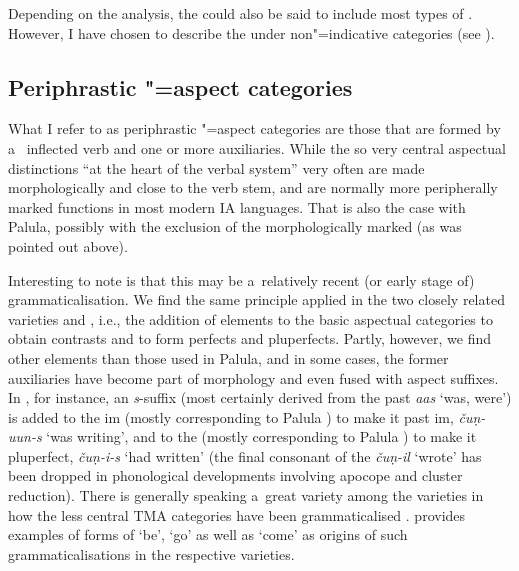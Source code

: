 Depending on the analysis, the  could also be said to include most types of . However, I have chosen to describe the  under non"=indicative categories (see ).


\subsection{Periphrastic "=aspect categories}
\label{subsec:9-1-5}

What I refer to as periphrastic "=aspect categories are those that are formed by a~ inflected verb and one or more auxiliaries. While the so very central aspectual distinctions ``at the heart of the  verbal system'' \citep[262]{masica1991} very often are made morphologically and close to the verb stem,  and  are normally more peripherally marked functions in most modern IA languages. That is also the case with Palula, possibly with the exclusion of the morphologically marked  (as was pointed out above). 



Interesting to note is that this may be a~relatively recent (or early stage of) grammaticalisation. We find the same principle applied in the two closely related varieties  and , i.e., the addition of elements to the basic aspectual categories to obtain  contrasts and to form perfects and pluperfects. Partly, however, we find other elements than those used in Palula, and in some cases, the former auxiliaries have become part of  morphology and even fused with aspect suffixes. In , for instance, an \textit{s}-suffix (most certainly derived from the past  \textit{aas} `was, were') is added to the im (mostly corresponding to Palula ) to make it past im, \textit{čuṇ-uun-s} `was writing', and to the  (mostly corresponding to Palula ) to make it pluperfect, \textit{čuṇ-i-s} `had written' (the final consonant of the  \textit{čuṇ-il} `wrote' has been dropped in phonological developments involving apocope and cluster reduction). There is generally speaking a~great variety among the  varieties in how the less central TMA categories have been grammaticalised \citep[144--156]{liljegren2013}. \citet[38]{schmidt2004} provides examples of forms of `be', `go' as well as `come' as origins of such grammaticalisations in the respective varieties. 



